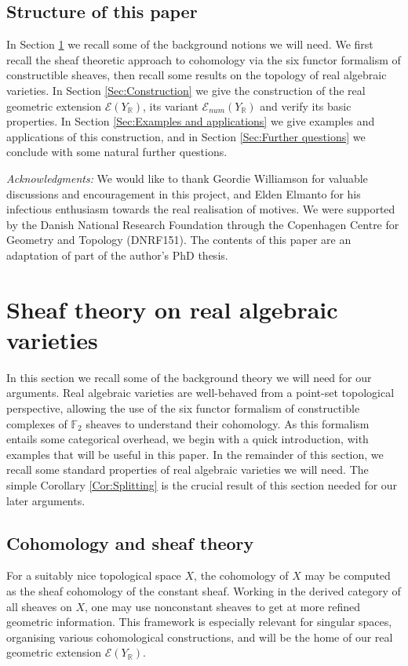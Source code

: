 \documentclass{amsart}
\theoremstyle{definition}
\theoremstyle{remark}
\begin{document}
\subsection{Structure of this paper}
In Section \ref{Sec:background} we recall some of the background notions we will need. We first recall the sheaf theoretic approach to cohomology via the six functor formalism of constructible sheaves, then recall some results on the topology of real algebraic varieties. In Section \ref{Sec:Construction} we give the construction of the real geometric extension $\mathscr{E}(Y_\mathbb{R})$, its variant $\mathscr{E}_{num}(Y_\mathbb{R})$ and verify its basic properties. In Section \ref{Sec:Examples and applications} we give examples and applications of this construction, and in Section \ref{Sec:Further questions} we conclude with some natural further questions.\\
\par
\emph{Acknowledgments:}
We would like to thank Geordie Williamson for valuable discussions and encouragement in this project, and Elden Elmanto for his infectious enthusiasm towards the real realisation of motives. We were supported by the Danish National Research Foundation through the Copenhagen Centre for Geometry and Topology (DNRF151). The contents of this paper are an adaptation of part of the author's PhD thesis.

\section{Sheaf theory on real algebraic varieties}\label{Sec:background}

In this section we recall some of the background theory we will need for our arguments. Real algebraic varieties are well-behaved from a point-set topological perspective, allowing the use of the six functor formalism of constructible complexes of $\mathbb{F}_2$ sheaves to understand their cohomology. As this formalism entails some categorical overhead, we begin with a quick introduction, with examples that will be useful in this paper. In the remainder of this section, we recall some standard properties of real algebraic varieties we will need. The simple Corollary \ref{Cor:Splitting} is the crucial result of this section needed for our later arguments.
\subsection{Cohomology and sheaf theory}
For a suitably nice topological space $X$, the cohomology of $X$ may be computed as the sheaf cohomology of the constant sheaf. Working in the derived category of all sheaves on $X$, one may use nonconstant sheaves to get at more refined geometric information. This framework is especially relevant for singular spaces, organising various cohomological constructions, and will be the home of our real geometric extension $\mathscr{E}(Y_\mathbb{R})$.
\end{document}
